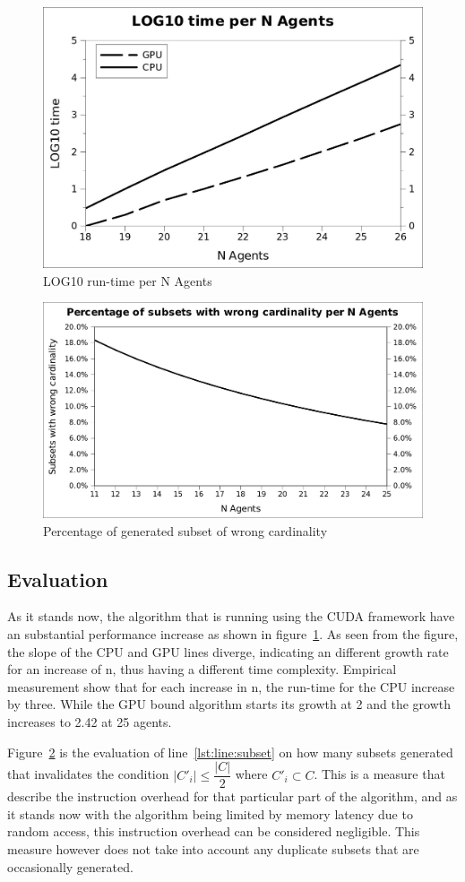 \documentclass[a4paper, 12pt]{report}
\begin{document}
\begin{figure}[htb]
\centering
\includegraphics[bb=0 0 925 1346 width=0.7\linewidth]{loggraph.jpg}
\caption{LOG10 run-time per N Agents\label{log}}
\end{figure}
\begin{figure}[htb]
\centering
\includegraphics[bb= 0 0 996 1753 width=0.7\linewidth]{subset.jpg}
\caption{Percentage of generated subset of wrong cardinality\label{overhead}}
\end{figure}
\subsection{Evaluation}
As it stands now, the algorithm that is running using the CUDA framework have an substantial performance increase as shown in figure~\ref{log}. As seen from the figure, the slope of the CPU and GPU lines diverge, indicating an different growth rate for an increase of n, thus having a different time complexity. Empirical measurement show that for each increase in n, the run-time for the CPU increase by three. While the GPU bound algorithm starts its growth at 2 and the growth increases to 2.42 at 25 agents.

Figure~\ref{overhead} is the evaluation of line~\ref{lst:line:subset} on how many subsets generated that invalidates the condition $\vert C'_{i} \vert \leq \dfrac{\vert C\vert }{2}$ where $C'_i \subset C$. This is a measure that describe the instruction overhead for that particular part of the algorithm, and as it stands now with the algorithm being limited by memory latency due to random access, this instruction overhead can be considered negligible. This measure however does not take into account any duplicate subsets that are occasionally generated.
\end{document}
